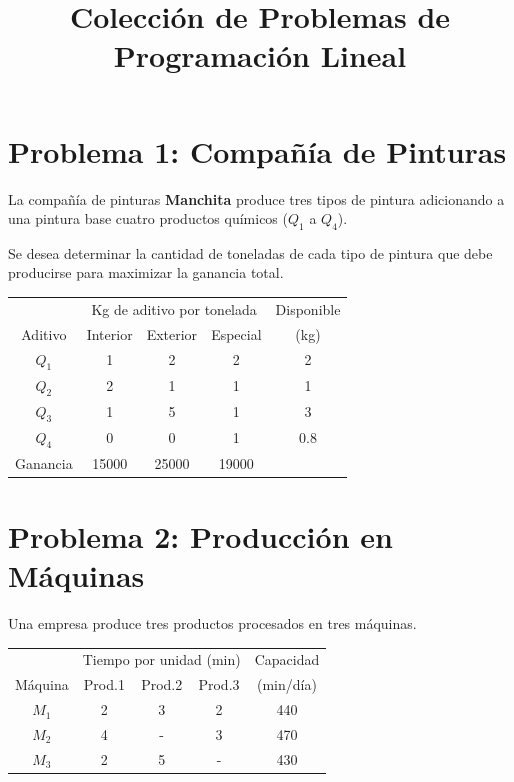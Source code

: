 \documentclass[12pt]{article}
\title{Colección de Problemas de Programación Lineal}
\author{}
\date{}
\begin{document}
\maketitle

\section*{Problema 1: Compañía de Pinturas}

La compañía de pinturas \textbf{Manchita} produce tres tipos de pintura adicionando a una pintura base cuatro productos químicos ($Q_1$ a $Q_4$). 

Se desea determinar la cantidad de toneladas de cada tipo de pintura que debe producirse para maximizar la ganancia total.

\bigskip

\begin{center}
\begin{tabular}{c|ccc|c}
\toprule
 & \multicolumn{3}{c|}{Kg de aditivo por tonelada} & Disponible \\
Aditivo & Interior & Exterior & Especial & (kg) \\
\midrule
$Q_1$ & 1 & 2 & 2 & 2 \\
$Q_2$ & 2 & 1 & 1 & 1 \\
$Q_3$ & 1 & 5 & 1 & 3 \\
$Q_4$ & 0 & 0 & 1 & 0.8 \\
\midrule
Ganancia & 15000 & 25000 & 19000 & \\
\bottomrule
\end{tabular}
\end{center}

\section*{Problema 2: Producción en Máquinas}

Una empresa produce tres productos procesados en tres máquinas.

\begin{center}
\begin{tabular}{c|ccc|c}
\toprule
 & \multicolumn{3}{c|}{Tiempo por unidad (min)} & Capacidad \\
Máquina & Prod.1 & Prod.2 & Prod.3 & (min/día) \\
\midrule
$M_1$ & 2 & 3 & 2 & 440 \\
$M_2$ & 4 & - & 3 & 470 \\
$M_3$ & 2 & 5 & - & 430 \\
\bottomrule
\end{tabular}
\end{center}
\end{document}
